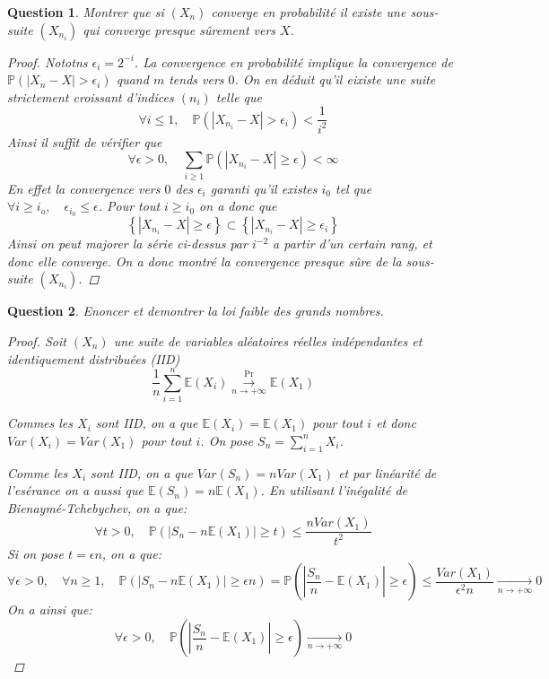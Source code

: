 \documentclass{article}
\theoremstyle{plain}
\newtheorem{question}{Question}
\begin{document}
\begin{question}
	Montrer que si $(X_n)$ converge en probabilité il existe une sous-suite $(X_{n_i})$ qui converge presque sûrement vers $X$.
	\begin{proof}
		Nototns $\epsilon_i = 2^{-i}$. La convergence en probabilité implique la convergence de $\mathbb{P} (|X_n - X| > \epsilon_i)$ quand $m$ tends vers $0$.
		On en déduit qu'il eixiste une suite strictement croissant d'indices $(n_i)$ telle que
		$$\forall i \leq 1, \quad \mathbb{P} (|X_{n_i} - X| > \epsilon_i) < \frac{1}{i^2}$$
		Ainsi il suffit de vérifier que
		$$\forall \epsilon > 0, \quad \sum_{i \geq 1} \mathbb{P} (|X_{n_i} - X| \geq \epsilon) < \infty$$
		En effet la convergence vers $0$ des $\epsilon_i$ garanti qu'il existes $i_0$ tel que $\forall i \geq i_o, \quad
			\epsilon_{i_0} \leq \epsilon$. Pour tout $i \geq i_0$ on a donc que
		$$ \left\{|X_{n_i} - X| \geq \epsilon \right\} \subset \left\{|X_{n_i} - X| \geq \epsilon_{i} \right\}$$
		Ainsi on peut majorer la série ci-dessus par $i^{-2}$ a partir d'un certain rang, et donc elle converge.
		On a donc montré la convergence presque sûre de la sous-suite $(X_{n_i})$.
	\end{proof}
\end{question}


\begin{question}
	Enoncer et demontrer la loi faible des grands nombres.
	\begin{proof}
		Soit $(X_n)$ une suite de variables aléatoires réelles indépendantes et identiquement distribuées (IID)
		\begin{equation}
			\frac{1}{n}\sum_{i=1}^n \mathbb{E} (X_i) \overset{\Pr}{\underset{n\to +\infty}{\longrightarrow}} \mathbb{E} (X_1)
		\end{equation}

		Commes les $X_i$ sont IID, on a que $\mathbb{E} (X_i) = \mathbb{E} (X_1)$ pour tout $i$ et donc
		$Var(X_i) = Var(X_1)$ pour tout $i$. On pose $S_n = \sum_{i=1}^n X_i$.

		Comme les $X_i$ sont IID, on a que $Var(S_n) = nVar(X_1)$ et par linéarité de l'esérance on a aussi que
		$\mathbb{E} (S_n) = n\mathbb{E} (X_1)$. En utilisant l'inégalité de Bienaymé-Tchebychev, on a que:
		\begin{equation*}
			\forall t > 0, \quad \mathbb{P} (|S_n - n\mathbb{E} (X_1)| \geq t) \leq \frac{nVar(X_1)}{t^2}
		\end{equation*}
		Si on pose $t = \epsilon n$, on a que:
		\begin{equation*}
			\forall \epsilon > 0, \quad \forall n \geq 1, \quad \mathbb{P} \left(|S_n - n\mathbb{E} (X_1)| \geq \epsilon n\right) =
			\mathbb{P} \left(|\frac{S_n}{n} - \mathbb{E} (X_1)| \geq \epsilon\right) \leq \frac{Var(X_1)}{\epsilon^2 n} \underset{n\to +\infty}{\longrightarrow} 0
		\end{equation*}
		On a ainsi que:
		$$ \forall \epsilon > 0,\quad \mathbb{P} \left(|\frac{S_n}{n} - \mathbb{E} (X_1)| \geq \epsilon\right) \underset{n\to +\infty}{\longrightarrow} 0$$
	\end{proof}
\end{question}
\end{document}
